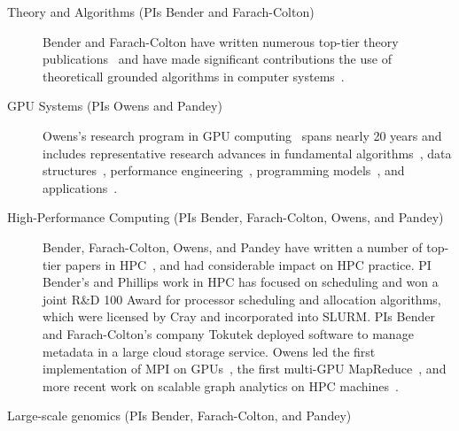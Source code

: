 \begin{description}
  \item[Theory and Algorithms (PIs Bender and Farach-Colton)]
    Bender and Farach-Colton have written numerous
    top-tier theory
    publications~\cite{DBLP:conf/stoc/BenderFK19,DBLP:conf/focs/BenderFGJM018,DBLP:conf/soda/BenderCCFJT19,DBLP:conf/soda/AfshaniBFFGT17,DBLP:conf/pods/BenderFJMMPX17,DBLP:conf/stoc/BenderKPY16,DBLP:conf/soda/BenderFGKM17,DBLP:conf/pods/BenderBJKMPSSZ16}
    and have made significant contributions the use of theoreticall grounded algorithms in computer systems~\cite{BenderFaGo18,BenderFaJo12,BenderFaJo11,PandeyBeJo17,PandeyAlBe18,PandeyBeJo18,PandeyBeJo17c,DBLP:conf/icalp/ConwayFS18,betrfsmany,other}.


    \item[GPU Systems (PIs Owens and Pandey)] Owens's research program in GPU computing~\cite{Owens:2007:ASO,Owens:2008:GC} spans nearly 20 years and includes representative research advances in fundamental algorithms~\cite{Sengupta:2007:SPF}, data structures~\cite{Lefohn:2006:GGE,Alcantara:2009:RPH}, %
    performance engineering~\cite{Zhang:2011:AQP}, programming models~\cite{Gupta:2012:ASO, Tzeng:2010:TMF}, and applications~\cite{Wang:2017:GGG}.

    \item[High-Performance Computing (PIs Bender, Farach-Colton, Owens, and
        Pandey)] Bender, Farach-Colton, Owens, and Pandey have
      written a number of top-tier papers in HPC~\cite{pandey2020timely,bender2017two,eckstein2015pebbl,agrawal1989four,bender2008communication,greenberg1999enabling},
      and had considerable impact on HPC practice.  PI Bender's and Phillips
      work in HPC has focused on scheduling and  won a joint R\&D 100 Award for
      processor scheduling and allocation algorithms, which were licensed by
      Cray and incorporated into SLURM.  PIs Bender and Farach-Colton's company
      Tokutek deployed software to manage metadata in a large cloud storage
      service. Owens led the first implementation of MPI on GPUs~\cite{Stuart:2009:MPO:withouturl,Stuart:2011:EMT}, the first multi-GPU MapReduce~\cite{Stuart:2011:MMO}, and more recent work on scalable graph analytics on HPC machines~\cite{Pan:2018:SBS,Pan:2017:MGA,Chen:2022:SIP}.

    \item[Large-scale genomics (PIs Bender, Farach-Colton, and Pandey)]

\end{description}


